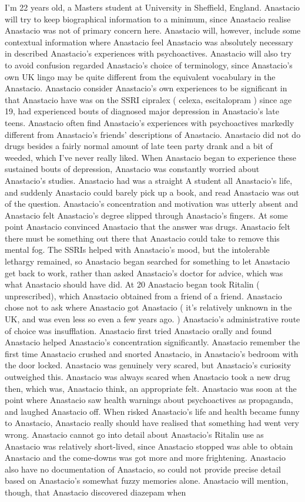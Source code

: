 \documentclass[12pt]{book}
\begin{document}
I'm 22 years old, a Masters student at University in Sheffield, England. Anastacio will try to keep biographical information to a minimum, since Anastacio realise Anastacio was not of primary concern here. Anastacio will, however, include some contextual information where Anastacio feel Anastacio was absolutely necessary in described Anastacio's experiences with psychoactives. Anastacio will also try to avoid confusion regarded Anastacio's choice of terminology, since Anastacio's own UK lingo may be quite different from the equivalent vocabulary in the Anastacio. Anastacio consider Anastacio's own experiences to be significant in that Anastacio have was on the SSRI cipralex ( celexa, escitalopram ) since age 19, had experienced bouts of diagnosed major depression in Anastacio's late teens. Anastacio often find Anastacio's experiences with psychoactives markedly different from Anastacio's friends' descriptions of Anastacio. Anastacio did not do drugs besides a fairly normal amount of late teen party drank and a bit of weeded, which I've never really liked. When Anastacio began to experience these sustained bouts of depression, Anastacio was constantly worried about Anastacio's studies. Anastacio had was a straight A student all Anastacio's life, and suddenly Anastacio could barely pick up a book, and read Anastacio was out of the question. Anastacio's concentration and motivation was utterly absent and Anastacio felt Anastacio's degree slipped through Anastacio's fingers. At some point Anastacio convinced Anastacio that the answer was drugs. Anastacio felt there must be something out there that Anastacio could take to remove this mental fog. The SSRIs helped with Anastacio's mood, but the intolerable lethargy remained, so Anastacio began searched for something to let Anastacio get back to work, rather than asked Anastacio's doctor for advice, which was what Anastacio should have did. At 20 Anastacio began took Ritalin ( unprescribed), which Anastacio obtained from a friend of a friend. Anastacio chose not to ask where Anastacio got Anastacio ( it's relatively unknown in the UK, and was even less so even a few years ago. ) Anastacio's administrative route of choice was insufflation. Anastacio first tried Anastacio orally and found Anastacio helped Anastacio's concentration significantly. Anastacio remember the first time Anastacio crushed and snorted Anastacio, in Anastacio's bedroom with the door locked. Anastacio was genuinely very scared, but Anastacio's curiosity outweighed this. Anastacio was always scared when Anastacio took a new drug then, which was, Anastacio think, an appropriate felt. Anastacio was soon at the point where Anastacio saw health warnings about psychoactives as propaganda, and laughed Anastacio off. When risked Anastacio's life and health became funny to Anastacio, Anastacio really should have realised that something had went very wrong. Anastacio cannot go into detail about Anastacio's Ritalin use as Anastacio was relatively short-lived, since Anastacio stopped was able to obtain Anastacio and the come-downs was got more and more frightening. Anastacio also have no documentation of Anastacio, so could not provide precise detail based on Anastacio's somewhat fuzzy memories alone. Anastacio will mention, though, that Anastacio discovered diazepam when 
\end{document}
